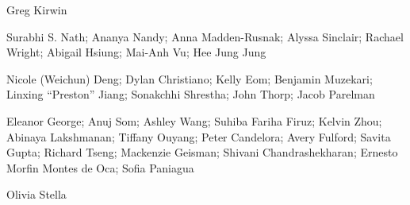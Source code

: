 
\par
\begin{cvparagraph}
Greg Kirwin
\end{cvparagraph}

\par
\begin{cvparagraph}
Surabhi S. Nath; Ananya Nandy; Anna Madden-Rusnak; Alyssa Sinclair; Rachael Wright; Abigail Hsiung; Mai-Anh Vu; Hee Jung Jung
\end{cvparagraph}

\par
\begin{cvparagraph}
Nicole (Weichun) Deng; Dylan Christiano; Kelly Eom; Benjamin Muzekari; Linxing ``Preston'' Jiang; Sonakchhi Shrestha; John Thorp; Jacob Parelman
\end{cvparagraph}

\par
\begin{cvparagraph}
Eleanor George; Anuj Som; Ashley Wang; Suhiba Fariha Firuz; Kelvin Zhou; Abinaya Lakshmanan; Tiffany Ouyang; Peter Candelora; Avery Fulford; Savita Gupta; Richard Tseng; Mackenzie Geisman; Shivani Chandrashekharan; Ernesto Morfin Montes de Oca; Sofia Paniagua
\end{cvparagraph}

\par
\begin{cvparagraph}
Olivia Stella
\end{cvparagraph}
